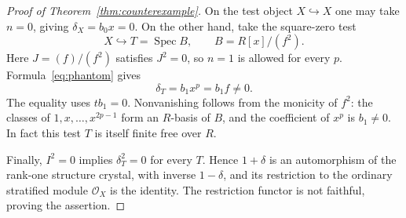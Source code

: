 \documentclass[11pt]{article}
\newcommand{\OO}{\mathcal O}\newcommand{\Fp}{\mathbf F_p}
\DeclareMathOperator{\Spec}{Spec}\DeclareMathOperator{\Hom}{Hom}
\theoremstyle{definition}\newtheorem{definition}[theorem]{Definition}
\theoremstyle{remark}\newtheorem{remark}[theorem]{Remark}
\begin{document}
\begin{proof}[Proof of Theorem~\ref{thm:counterexample}]
On the test object $X\hookrightarrow X$ one may take $n=0$, giving
$\delta_X=b_0x=0$.  On the other hand, take the square-zero test
\[
             X\hookrightarrow T=\Spec B,\qquad B=R[x]/(f^2).
\]
Here $J=(f)/(f^2)$ satisfies $J^2=0$, so $n=1$ is allowed for every $p$.  Formula~\eqref{eq:phantom} gives
\[
                  \delta_T=b_1x^p=b_1f\ne0.
\]
The equality uses $tb_1=0$.  Nonvanishing follows from the monicity of $f^2$: the classes of $1,x,\ldots,x^{2p-1}$ form an $R$-basis of $B$, and the coefficient of $x^p$ is $b_1\ne0$.  In fact this test $T$ is itself finite free over $R$.

Finally, $I^2=0$ implies $\delta_T^2=0$ for every $T$.  Hence $1+\delta$ is an automorphism of the rank-one structure crystal, with inverse $1-\delta$, and its restriction to the ordinary stratified module $\OO_X$ is the identity.  The restriction functor is not faithful, proving the assertion.
\end{proof}
\end{document}
